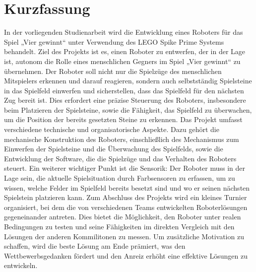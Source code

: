 \chapter*{Kurzfassung} %

In der vorliegenden Studienarbeit wird die Entwicklung eines Roboters für das Spiel „Vier gewinnt“ unter Verwendung des LEGO Spike Prime Systems behandelt. Ziel des Projekts ist es, einen Roboter zu entwerfen, der in der Lage ist, autonom die Rolle eines menschlichen Gegners im Spiel „Vier gewinnt“ zu übernehmen. Der Roboter soll nicht nur die Spielzüge des menschlichen Mitspielers erkennen und darauf reagieren, sondern auch selbstständig Spielsteine in das Spielfeld einwerfen und sicherstellen, dass das Spielfeld für den nächsten Zug bereit ist. Dies erfordert eine präzise Steuerung des Roboters, insbesondere beim Platzieren der Spielsteine, sowie die Fähigkeit, das Spielfeld zu überwachen, um die Position der bereits gesetzten Steine zu erkennen.
Das Projekt umfasst verschiedene technische und organisatorische Aspekte. Dazu gehört die mechanische Konstruktion des Roboters, einschließlich des Mechanismus zum Einwerfen der Spielsteine und die Überwachung des Spielfelds, sowie die Entwicklung der Software, die die Spielzüge und das Verhalten des Roboters steuert. Ein weiterer wichtiger Punkt ist die Sensorik: Der Roboter muss in der Lage sein, die aktuelle Spielsituation durch Farbsensoren zu erfassen, um zu wissen, welche Felder im Spielfeld bereits besetzt sind und wo er seinen nächsten Spielstein platzieren kann.
Zum Abschluss des Projekts wird ein kleines Turnier organisiert, bei dem die von verschiedenen Teams entwickelten Roboterlösungen gegeneinander antreten. Dies bietet die Möglichkeit, den Roboter unter realen Bedingungen zu testen und seine Fähigkeiten im direkten Vergleich mit den Lösungen der anderen Kommilitonen zu messen. Um zusätzliche Motivation zu schaffen, wird die beste Lösung am Ende prämiert, was den Wettbewerbsgedanken fördert und den Anreiz erhöht eine effektive Lösungen zu entwickeln.

\clearpage

